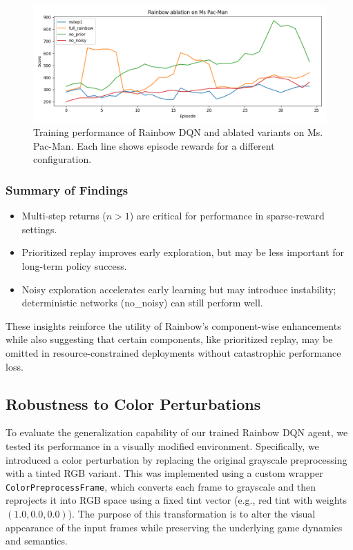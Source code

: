\documentclass{article}
\begin{document}
\begin{figure}[h]
    \centering
    \includegraphics[width=\linewidth]{rainbow_ablation_smooth.png}
    \caption{Training performance of Rainbow DQN and ablated variants on Ms. Pac-Man. Each line shows episode rewards for a different configuration.}
    \label{fig:rainbow_ablation}
\end{figure}

\subsubsection*{Summary of Findings}
\begin{itemize}
    \item Multi-step returns ($n > 1$) are critical for performance in sparse-reward settings.
    \item Prioritized replay improves early exploration, but may be less important for long-term policy success.
    \item Noisy exploration accelerates early learning but may introduce instability; deterministic networks (no\_noisy) can still perform well.
\end{itemize}

These insights reinforce the utility of Rainbow’s component-wise enhancements while also suggesting that certain components, like prioritized replay, may be omitted in resource-constrained deployments without catastrophic performance loss.

\subsection{Robustness to Color Perturbations}

To evaluate the generalization capability of our trained Rainbow DQN agent, we tested its performance in a visually modified environment. Specifically, we introduced a color perturbation by replacing the original grayscale preprocessing with a tinted RGB variant. This was implemented using a custom wrapper \texttt{ColorPreprocessFrame}, which converts each frame to grayscale and then reprojects it into RGB space using a fixed tint vector (e.g., red tint with weights $(1.0, 0.0, 0.0)$). The purpose of this transformation is to alter the visual appearance of the input frames while preserving the underlying game dynamics and semantics.
\end{document}
